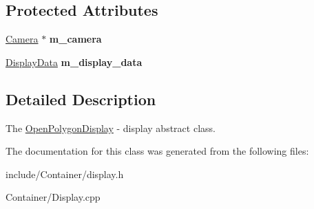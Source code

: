 \subsection*{Protected Attributes}
\begin{DoxyCompactItemize}
\item 
\hypertarget{classEngine_1_1OpenPolygonDisplay_a01757c9ac3a6a7154bcbce0554f073d4}{}\hyperlink{classEngine_1_1Camera}{Camera} $\ast$ {\bfseries m\+\_\+camera}\label{classEngine_1_1OpenPolygonDisplay_a01757c9ac3a6a7154bcbce0554f073d4}

\item 
\hypertarget{classEngine_1_1OpenPolygonDisplay_a57815602663a8c4a3614eb1e92753a7e}{}\hyperlink{structEngine_1_1DisplayData}{Display\+Data} {\bfseries m\+\_\+display\+\_\+data}\label{classEngine_1_1OpenPolygonDisplay_a57815602663a8c4a3614eb1e92753a7e}

\end{DoxyCompactItemize}


\subsection{Detailed Description}
The \hyperlink{classEngine_1_1OpenPolygonDisplay}{Open\+Polygon\+Display} -\/ display abstract class. 

The documentation for this class was generated from the following files\+:\begin{DoxyCompactItemize}
\item 
include/\+Container/display.\+h\item 
Container/Display.\+cpp\end{DoxyCompactItemize}
